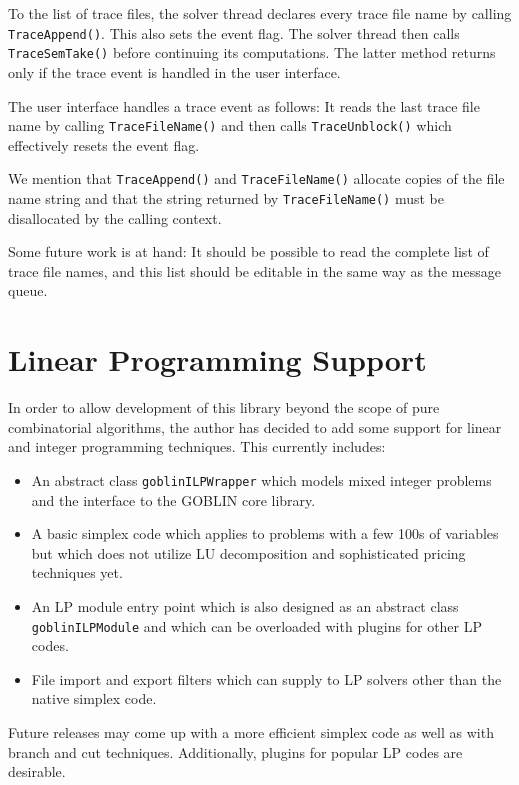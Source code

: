 \documentclass[a4paper,11pt,twoside]{book}
\begin{document}
\begin{multicols}{2}
To the list of trace files, the solver thread declares every trace file name by
calling \verb/TraceAppend()/. This also sets the event flag. The solver thread
then calls \verb/TraceSemTake()/ before continuing its computations.
The latter method returns only if the trace event is handled in the user
interface.

The user interface handles a trace event as follows: It reads the last trace
file name by calling \verb/TraceFileName()/ and then calls \verb/TraceUnblock()/
which effectively resets the event flag.

We mention that \verb/TraceAppend()/ and \verb/TraceFileName()/ allocate copies
of the file name string and that the string returned by \verb/TraceFileName()/
must be disallocated by the calling context.
 
Some future work is at hand: It should be possible to read the complete
list of trace file names, and this list should be editable in the same way as
the message queue.



\cleardoublepage
{}
\chapter{Linear Programming Support}
\thispagestyle{fancy}
\label{clb_lpsolve}
In order to allow development of this library beyond the scope of pure
combinatorial algorithms, the author has decided to add some support for
linear and integer programming techniques. This currently includes:
\begin{itemize}
\item An abstract class \verb/goblinILPWrapper/ which models mixed integer
    problems and the interface to the GOBLIN core library.
\item A basic simplex code which applies to problems with a few 100s of
    variables but which does not utilize LU decomposition and sophisticated
    pricing techniques yet.
\item An LP module entry point which is also designed as an abstract class
    \verb/goblinILPModule/ and which can be overloaded with plugins for other
    LP codes.
\item File import and export filters which can supply to LP solvers other than
    the native simplex code.
\end{itemize}
Future releases may come up with a more efficient simplex code as well as with
branch and cut techniques. Additionally, plugins for popular LP codes are
desirable.


\end{multicols}
\end{document}
